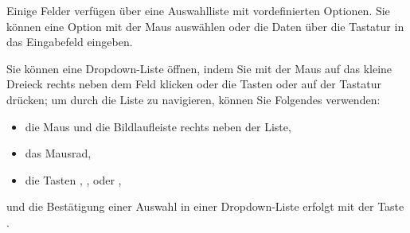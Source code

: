 Einige Felder verfügen über eine Auswahlliste mit vordefinierten Optionen. Sie können eine Option mit der Maus auswählen oder die Daten über die Tastatur in das Eingabefeld eingeben.

Sie können eine Dropdown-Liste öffnen, indem Sie mit der Maus auf das kleine Dreieck rechts neben dem Feld klicken oder die Tasten  oder  auf der Tastatur drücken; um durch die Liste zu navigieren, können Sie Folgendes verwenden:
\begin{itemize}
	\item die Maus und die Bildlaufleiste rechts neben der Liste,
	\item das Mausrad,
	\item die Tasten , , \keys{\arrowkeyup} oder \keys{\arrowkeydown},
\end{itemize}
und die Bestätigung einer Auswahl in einer Dropdown-Liste erfolgt mit der Taste .

